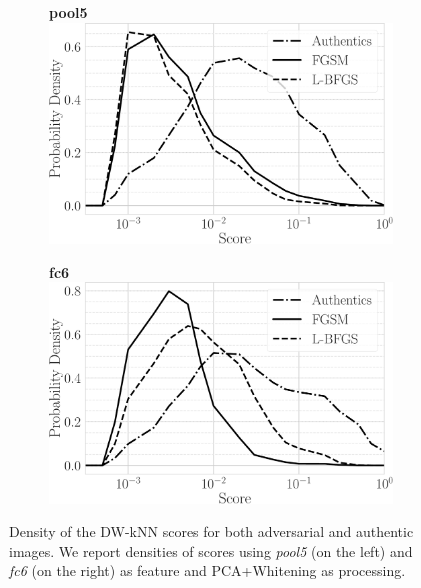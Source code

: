 \begin{figure}
\centering%
%
\begin{subfigure}[t]{0.5\linewidth}%
\centering
\textbf{pool5}\\
\includegraphics[width=\linewidth]{distrib-pool5}%
\label{fig:adv:score-density-pool5}%
\end{subfigure}%
%
\begin{subfigure}[t]{0.5\linewidth}%
\centering
\textbf{fc6}\\
\includegraphics[width=\linewidth]{distrib-fc6}%
\label{fig:adv:score-density-fc6}%
\end{subfigure}%
%
\caption{Density of the DW-kNN scores for both adversarial and authentic images.
We report densities of scores using \emph{pool5} (on the left) and \emph{fc6} (on the right) as feature and PCA+Whitening as processing.}
\label{fig:adv:score-densities}
\end{figure}

